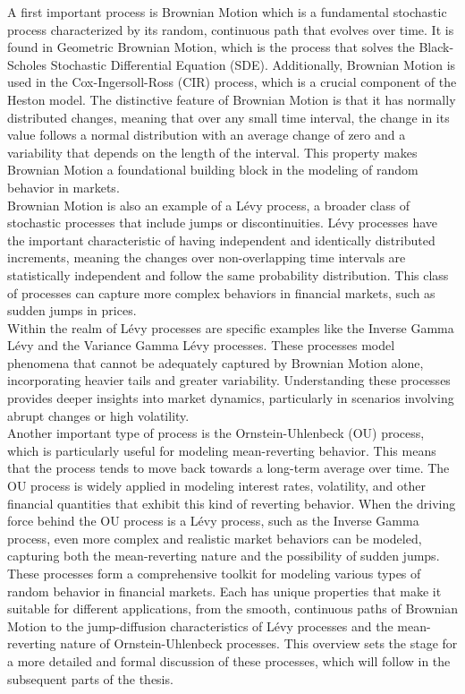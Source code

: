 A first important process is Brownian Motion which is a fundamental stochastic process characterized by its random, continuous path that evolves over time. It is found in Geometric Brownian Motion, which is the process that solves the Black-Scholes Stochastic Differential Equation (SDE). Additionally, Brownian Motion is used in the Cox-Ingersoll-Ross (CIR) process, which is a crucial component of the Heston model. The distinctive feature of Brownian Motion is that it has normally distributed changes, meaning that over any small time interval, the change in its value follows a normal distribution with an average change of zero and a variability that depends on the length of the interval. This property makes Brownian Motion a foundational building block in the modeling of random behavior in markets.\\

Brownian Motion is also an example of a Lévy process, a broader class of stochastic processes that include jumps or discontinuities. Lévy processes have the important characteristic of having independent and identically distributed increments, meaning the changes over non-overlapping time intervals are statistically independent and follow the same probability distribution. This class of processes can capture more complex behaviors in financial markets, such as sudden jumps in prices.\\

Within the realm of Lévy processes are specific examples like the Inverse Gamma Lévy and the Variance Gamma Lévy processes. These processes model phenomena that cannot be adequately captured by Brownian Motion alone, incorporating heavier tails and greater variability. Understanding these processes provides deeper insights into market dynamics, particularly in scenarios involving abrupt changes or high volatility.\\

Another important type of process is the Ornstein-Uhlenbeck (OU) process, which is particularly useful for modeling mean-reverting behavior. This means that the process tends to move back towards a long-term average over time. The OU process is widely applied in modeling interest rates, volatility, and other financial quantities that exhibit this kind of reverting behavior. When the driving force behind the OU process is a Lévy process, such as the Inverse Gamma process, even more complex and realistic market behaviors can be modeled, capturing both the mean-reverting nature and the possibility of sudden jumps.\\

These processes form a comprehensive toolkit for modeling various types of random behavior in financial markets. Each has unique properties that make it suitable for different applications, from the smooth, continuous paths of Brownian Motion to the jump-diffusion characteristics of Lévy processes and the mean-reverting nature of Ornstein-Uhlenbeck processes. This overview sets the stage for a more detailed and formal discussion of these processes, which will follow in the subsequent parts of the thesis.